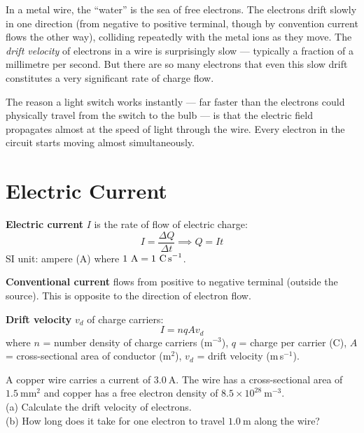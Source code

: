 In a metal wire, the ``water'' is the sea of free
electrons. The electrons drift slowly in one direction
(from negative to positive terminal, though by
convention current flows the other way), colliding
repeatedly with the metal ions as they move. The
\textit{drift velocity} of electrons in a wire is
surprisingly slow --- typically a fraction of a
millimetre per second. But there are so many electrons
that even this slow drift constitutes a very significant
rate of charge flow.

The reason a light switch works instantly --- far faster
than the electrons could physically travel from the
switch to the bulb --- is that the electric field
propagates almost at the speed of light through the
wire. Every electron in the circuit starts moving
almost simultaneously.

\section{Electric Current}

\begin{definitionbox}
\textbf{Electric current} $I$ is the rate of flow
of electric charge:
\[
  I = \frac{\Delta Q}{\Delta t}
  \implies Q = It
\]
SI unit: ampere (A) where
$1\ \text{A} = 1\ \text{C\,s}^{-1}$.

\textbf{Conventional current} flows from positive
to negative terminal (outside the source). This is
opposite to the direction of electron flow.

\textbf{Drift velocity} $v_d$ of charge carriers:
\[
  I = nqAv_d
\]
where $n$ = number density of charge carriers
(m$^{-3}$), $q$ = charge per carrier (C), $A$ =
cross-sectional area of conductor (m$^2$),
$v_d$ = drift velocity (m\,s$^{-1}$).
\end{definitionbox}

\begin{examplebox}[23.1]
A copper wire carries a current of $3.0\ \text{A}$.
The wire has a cross-sectional area of
$1.5\ \text{mm}^2$ and copper has a free electron
density of $8.5\times10^{28}\ \text{m}^{-3}$.\\
(a) Calculate the drift velocity of electrons.\\
(b) How long does it take for one electron to travel
$1.0\ \text{m}$ along the wire?
\end{examplebox}

